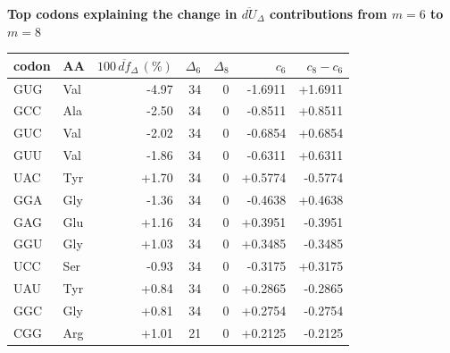 \begingroup
{}
\small
\setlength{\tabcolsep}{6pt}
\renewcommand{\arraystretch}{1.15}
\setlength{\LTleft}{0pt}
\setlength{\LTright}{0pt}
\noindent\textbf{Top codons explaining the change in $\overline{dU}_{\Delta}$ contributions from $m=6$ to $m=8$}\\
\begin{longtable}{l l r r r r r}
\toprule
codon & AA & $100\,\overline{df}_{\Delta}\,(\%)$ & $\Delta_6$ & $\Delta_8$ & $c_6$ & $c_8-c_6$ \\
\midrule
GUG & Val & -4.97 & 34 & 0 & -1.6911 & +1.6911 \\
GCC & Ala & -2.50 & 34 & 0 & -0.8511 & +0.8511 \\
GUC & Val & -2.02 & 34 & 0 & -0.6854 & +0.6854 \\
GUU & Val & -1.86 & 34 & 0 & -0.6311 & +0.6311 \\
UAC & Tyr & +1.70 & 34 & 0 & +0.5774 & -0.5774 \\
GGA & Gly & -1.36 & 34 & 0 & -0.4638 & +0.4638 \\
GAG & Glu & +1.16 & 34 & 0 & +0.3951 & -0.3951 \\
GGU & Gly & +1.03 & 34 & 0 & +0.3485 & -0.3485 \\
UCC & Ser & -0.93 & 34 & 0 & -0.3175 & +0.3175 \\
UAU & Tyr & +0.84 & 34 & 0 & +0.2865 & -0.2865 \\
GGC & Gly & +0.81 & 34 & 0 & +0.2754 & -0.2754 \\
CGG & Arg & +1.01 & 21 & 0 & +0.2125 & -0.2125 \\
\bottomrule
\end{longtable}
\endgroup


